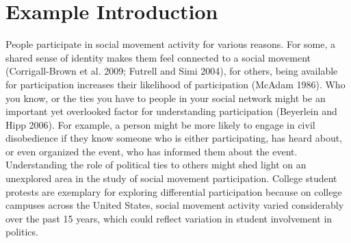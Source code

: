 \documentclass[12pt]{article}
\begin{document}
\newpage
\section*{\center Example Introduction}
People participate in social movement activity for various reasons. For some, a shared sense of identity makes them feel connected to a social movement (Corrigall-Brown et al. 2009; Futrell and Simi 2004), for others, being available for participation increases their likelihood of participation (McAdam 1986). Who you know, or the ties you have to people in your social network might be an important yet overlooked factor for understanding participation (Beyerlein and Hipp 2006). For example, a person might be more likely to engage in civil disobedience if they know someone who is either participating, has heard about, or even organized the event, who has informed them about the event. Understanding the role of political ties to others might shed light on an unexplored area in the study of social movement participation. College student protests are exemplary for exploring differential participation because on college campuses across the United States, social movement activity varied considerably over the past 15 years, which could reflect variation in student involvement in politics. 
\end{document}

